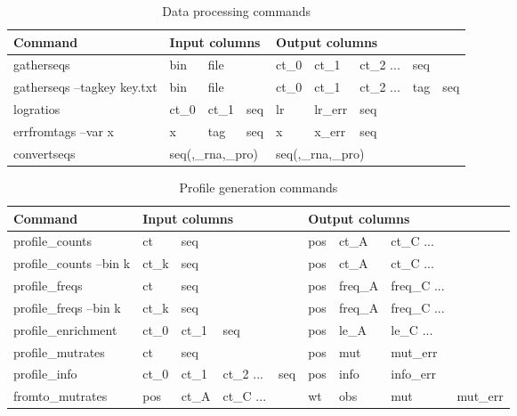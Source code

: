 \documentclass{bmcart}
\begin{document}
\begin{table}[h!]
\caption{Data processing commands}
\begin{myfont}
\begin{tabular}{l|lll|lllll}
\textsf{Command}                  & \multicolumn{3}{l|}{\textsf{Input columns}} & \multicolumn{5}{l}{\textsf{Output columns}} \\ \hline \hline
gatherseqs                        & bin    & file  &                            & ct\_0  & ct\_1    & ct\_2 ...  & seq \\
gatherseqs --tagkey key.txt & bin & file   &                                    & ct\_0  & ct\_1    & ct\_2 ...  & tag  & seq \\
logratios                         & ct\_0  & ct\_1 & seq                        & lr    & lr\_err   & seq \\ 
errfromtags --var x               & x      & tag   & seq                        & x     & x\_err    & seq \\ 
convertseqs                       & \multicolumn{3}{l|}{seq(,\_rna,\_pro)}      & \multicolumn{5}{l}{seq(,\_rna,\_pro)} \\ 
\end{tabular}
\end{myfont}
\end{table}

\begin{table}[h!]
\caption{Profile generation commands}
\begin{myfont}
\begin{tabular}{l|llll|llll}
\textsf{Command}        & \multicolumn{4}{l|}{\textsf{Input columns} }  & \multicolumn{4}{l}{\textsf{Output columns}} \\ \hline \hline
profile\_counts         & ct     & seq   &           &             & pos & ct\_A   & ct\_C ...  \\
profile\_counts --bin k & ct\_k  & seq   &           &             & pos & ct\_A   & ct\_C ...  \\
profile\_freqs          & ct     & seq   &           &             & pos & freq\_A & freq\_C ...\\
profile\_freqs --bin k  & ct\_k  & seq   &           &             & pos & freq\_A & freq\_C ...\\
profile\_enrichment     & ct\_0  & ct\_1 & seq       &             & pos & le\_A   & le\_C ...  \\
profile\_mutrates       & ct     & seq   &           &             & pos & mut     & mut\_err  \\
profile\_info           & ct\_0  & ct\_1 & ct\_2 ... & seq         & pos & info    & info\_err \\ 
fromto\_mutrates        & pos    & ct\_A & ct\_C ... &             & wt  & obs     & mut       & mut\_err 
\end{tabular}
\end{myfont}
\end{table}
\end{document}
